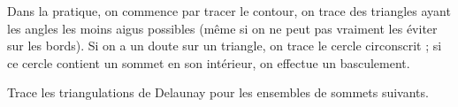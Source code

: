 \documentclass[class=report,crop=false, 12pt]{standalone}
\begin{document}
\begin{activite}
 Dans la pratique, on commence par tracer le contour, on trace des triangles ayant les angles les moins aigus possibles (même si on ne peut pas vraiment les éviter sur les bords). Si on a un doute sur un triangle, on trace le cercle circonscrit ; si ce cercle contient un sommet en son intérieur, on effectue un basculement.

Trace les triangulations de Delaunay pour les ensembles de sommets suivants.





\end{activite}
\end{document}
